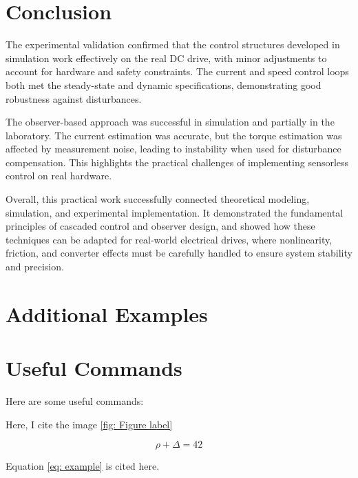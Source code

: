 \documentclass{rapportCS}
\begin{document}
\section{Conclusion}
The experimental validation confirmed that the control structures developed in simulation work effectively on the real DC drive, with minor adjustments to account for hardware and safety constraints. 
The current and speed control loops both met the steady-state and dynamic specifications, demonstrating good robustness against disturbances.

The observer-based approach was successful in simulation and partially in the laboratory. 
The current estimation was accurate, but the torque estimation was affected by measurement noise, leading to instability when used for disturbance compensation. 
This highlights the practical challenges of implementing sensorless control on real hardware.

Overall, this practical work successfully connected theoretical modeling, simulation, and experimental implementation. 
It demonstrated the fundamental principles of cascaded control and observer design, and showed how these techniques can be adapted for real-world electrical drives, where nonlinearity, friction, and converter effects must be carefully handled to ensure system stability and precision.






\newpage

\section{Additional Examples}




\section{Useful Commands}

Here are some useful commands:



Here, I cite the image \ref{fig: Figure label}



\begin{equation} \label{eq: example}
\rho + \Delta = 42
\end{equation}

Equation \ref{eq: example} is cited here. 
\end{document}
